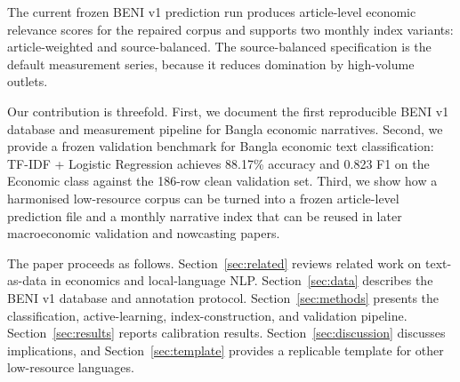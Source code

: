 The current frozen BENI v1 prediction run produces article-level economic relevance scores for the repaired corpus and supports two monthly index variants: article-weighted and source-balanced. The source-balanced specification is the default measurement series, because it reduces domination by high-volume outlets.

Our contribution is threefold. First, we document the first reproducible BENI v1 database and measurement pipeline for Bangla economic narratives. Second, we provide a frozen validation benchmark for Bangla economic text classification: TF-IDF + Logistic Regression achieves 88.17\% accuracy and 0.823 F1 on the Economic class against the 186-row clean validation set. Third, we show how a harmonised low-resource corpus can be turned into a frozen article-level prediction file and a monthly narrative index that can be reused in later macroeconomic validation and nowcasting papers.

The paper proceeds as follows. Section~\ref{sec:related} reviews related work on text-as-data in economics and local-language NLP. Section~\ref{sec:data} describes the BENI v1 database and annotation protocol. Section~\ref{sec:methods} presents the classification, active-learning, index-construction, and validation pipeline. Section~\ref{sec:results} reports calibration results. Section~\ref{sec:discussion} discusses implications, and Section~\ref{sec:template} provides a replicable template for other low-resource languages.
